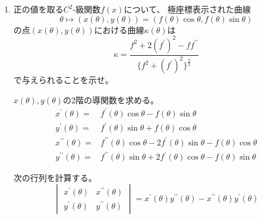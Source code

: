 \documentclass[12pt,b5paper]{ltjsarticle}
\begin{document}
\begin{enumerate}
\hrulefill


 \item
      正の値を取る$C^2$-級関数$f(x)$について、
      極座標表示された曲線
      \begin{equation}
       \theta \mapsto (x(\theta), y(\theta))
        = (f(\theta)\cos\theta, f(\theta)\sin\theta )
      \end{equation}
      の点$(x(\theta), y(\theta))$における曲線$\kappa(\theta)$は
      \begin{equation}
       \kappa =
        \frac{f^2+2(f^{\prime})^2-ff^{\prime\prime}}
        {\{f^2+(f^{\prime})^2\}^{\frac{3}{2}}}
      \end{equation}
      で与えられることを示せ。

\dotfill

      $x(\theta),y(\theta)$の2階の導関数を求める。
      \begin{align}
       x^{\prime}(\theta) =& f^{\prime}(\theta)\cos\theta-f(\theta)\sin\theta\\
       y^{\prime}(\theta) =& f^{\prime}(\theta)\sin\theta+f(\theta)\cos\theta\\
       x^{\prime\prime}(\theta) =& f^{\prime\prime}(\theta)\cos\theta - 2f^{\prime}(\theta)\sin\theta - f(\theta)\cos\theta\\
       y^{\prime\prime}(\theta) =& f^{\prime\prime}(\theta)\sin\theta + 2f^{\prime}(\theta)\cos\theta - f(\theta)\sin\theta
      \end{align}

      次の行列を計算する。
      \begin{equation}
       \begin{vmatrix}
        x^{\prime}(\theta) & x^{\prime\prime}(\theta)\\
        y^{\prime}(\theta) & y^{\prime\prime}(\theta)
       \end{vmatrix}
       =x^{\prime}(\theta)y^{\prime\prime}(\theta) - x^{\prime\prime}(\theta)y^{\prime}(\theta)
      \end{equation}


\end{enumerate}
\end{document}
